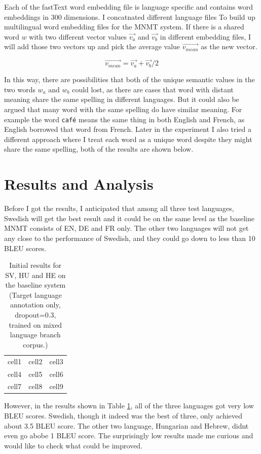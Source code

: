 \documentclass[thesis,fonts=libertine]{cluu}
\begin{document}
Each of the fastText word embedding file is language specific and contains word embeddings in 300 dimensions. I concatnated different language files To build up multilingual word embedding files for the MNMT system. If there is a shared word $w$ with two different vector values $\vec{v_a}$ and $\vec{v_b}$ in different embedding files, I will add those two vectors up and pick the average value $\vec{v_{mean}}$ as the new vector.

\begin{equation}
  \vec{v_{mean}} = \vec{v_a} + \vec{v_b} / 2
\end{equation}

In this way, there are possibilities that both of the unique semantic values in the two words $w_a$ and $w_b$ could lost, as there are cases that word with distant meaning share the same spelling in different languages. But it could also be argued that many word with the same spelling do have similar meaning. For example the word \verb|café| means the same thing in both English and French, as English borrowed that word from French. Later in the experiment I also tried a different approach where I treat each word as a unique word despite they might share the same spelling, both of the results are shown below.

\section{Results and Analysis}

Before I got the results, I anticipated that among all three test languages, Swedish will get the best result and it could be on the same level as the baseline MNMT consists of EN, DE and FR only. The other two languages will not get any close to the performance of Swedish, and they could go down to less than 10 BLEU scores.

\begin{table}
  \centering
  \begin{tabular}{c c c}
    cell1 & cell2 & cell3 \\ 
    cell4 & cell5 & cell6 \\  
    cell7 & cell8 & cell9 
  \end{tabular}
  \caption{Initial results for SV, HU and HE on the baseline system (Target language annotation only, dropout=0.3, trained on mixed language branch corpus.)}
  \label{table:initial_results}
\end{table}

However, in the results shown in Table \ref{table:initial_results}, all of the three languages got very low BLEU scores. Swedish, though it indeed was the best of three, only achieved about 3.5 BLEU score. The other two language, Hungarian and Hebrew, didnt even go abobe 1 BLEU score. The surprisingly low results made me curious and would like to check what could be improved.
\end{document}
